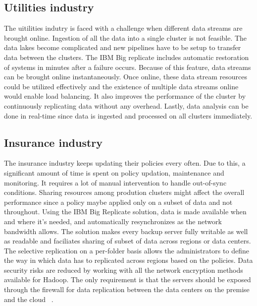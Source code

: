 \subsection{Utilities industry}
The uitilities indutry is faced with a challenge when different data streams are
brought online. Ingestion of all the data into a single cluster is not feasible.
The data lakes become complicated and new pipelines have to be setup to transfer
data between the clusters. The IBM Big replicate includes automatic restoration
of systems in minutes after a failure occurs. Because of this feature, data 
streams can be brought online instantaneously. Once online, these data stream
resources could be utilized effectively and the existence of multiple data 
streams online would enable load balancing.	It also improves the performance
of the cluster by continuously replicating data without any overhead. Lastly,
data analysis can be done in real-time since data is ingested and processed on 
all clusters immediately.

\subsection{Insurance industry}
The insurance industry keeps updating their policies every often. Due to this, a
significant amount of time is spent on policy updation, maintenance and
monitoring. It requires a lot of manual intervention to handle out-of-sync 
conditions. Sharing resources among prodution clusters might affect the overall
performance since a policy maybe applied only on a subset of data and not 
throughout. Using the IBM Big Replicate solution, data is made available when 
and where it’s needed, and automatically resynchronizes as the network
bandwidth allows. The solution makes every backup server fully writable as well
as readable and faciliates sharing of subset of data across regions or data 
centers. The selective replication on a per-folder basis allows the 
administrators to define the way in which data has to replicated across regions
based on the policies. Data security risks are reduced by working with all the 
network encryption methods available for Hadoop. The only requirement is that
the servers should be exposed through the firewall for data replication between
the data centers on the premise and the cloud
~\cite{hid-sp18-408-IBMBigReplicate-intro}.

